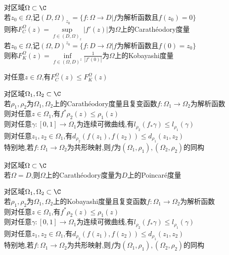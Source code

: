 \begin{dingyi}
对区域$\Omega\subset \C$\\
若$z_0\in\Omega$,记$(D,\Omega)_{z_0}=\{f:\Omega\to D|f\text{为解析函数且}f(z_0)=0\}$\\
则称$F_{C}^{\Omega}(z)=\sup\limits_{f\in(D,\Omega)_{z}}|f'(z)|$为$\Omega$上的Carathéodory度量\\
若$z_0\in\Omega$,记$(\Omega,D)^{z_0}=\{f:D\to \Omega|f\text{为解析函数且}f(0)=z_0\}$\\
则称$F_{K}^{\Omega}(z)=\inf\limits_{f\in(\Omega,D)^{z}}\frac{1}{|f'(0)|}$为$\Omega$上的Kobayashi度量
\end{dingyi}

\begin{zhu}
对任意$z\in\Omega$,有$F_{C}^{\Omega}(z)\leq F_{K}^{\Omega}(z)$
\end{zhu}

\begin{dingli}
对区域$\Omega_1,\Omega_2\subset \C$\\
若$\rho_1,\rho_2$为$\Omega_1,\Omega_2$上的Carathéodory度量且复变函数$f:\Omega_1\to\Omega_2$为解析函数\\
则对任意$z\in\Omega_1$,有$f^*\rho_2(z)\leq \rho_1(z)$\\
则对任意$\gamma:[0,1]\to\Omega_1$为连续可微曲线,有$l_{\rho_2}(f_*\gamma)\leq l_{\rho_1}(\gamma)$\\
则对任意$z_1,z_2\in\Omega_1$,有$d_{\rho_2}(f(z_1),f(z_2))\leq d_{\rho_1}(z_1,z_2)$\\
特别地,若$f:\Omega_1\to\Omega_2$为共形映射,则$f$为$(\Omega_1,\rho_1),(\Omega_2,\rho_2)$的同构
\end{dingli}

\begin{dingli}
对区域$\Omega\subset\C$\\
若$\Omega=D$,则$\Omega$上的Carathéodory度量为$D$上的Poincaré度量
\end{dingli}

\begin{dingli}
对区域$\Omega_1,\Omega_2\subset \C$\\
若$\rho_1,\rho_2$为$\Omega_1,\Omega_2$上的Kobayashi度量且复变函数$f:\Omega_1\to\Omega_2$为解析函数\\
则对任意$z\in\Omega_1$,有$f^*\rho_2(z)\leq \rho_1(z)$\\
则对任意$\gamma:[0,1]\to\Omega_1$为连续可微曲线,有$l_{\rho_2}(f_*\gamma)\leq l_{\rho_1}(\gamma)$\\
则对任意$z_1,z_2\in\Omega_1$,有$d_{\rho_2}(f(z_1),f(z_2))\leq d_{\rho_1}(z_1,z_2)$\\
特别地,若$f:\Omega_1\to\Omega_2$为共形映射,则$f$为$(\Omega_1,\rho_1),(\Omega_2,\rho_2)$的同构
\end{dingli}

